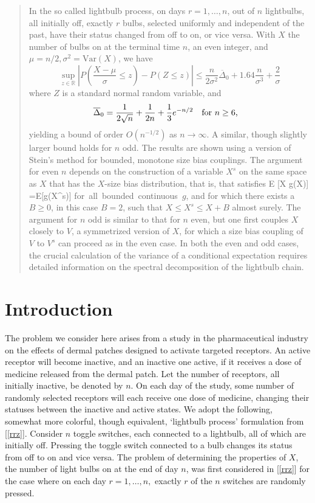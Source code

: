 \documentclass[10pt, amstex]{article}
\begin{document}
\begin{abstract}
In the so called lightbulb process, on days $r=1,\ldots,n$, out of $n$ lightbulbs, all initially off, exactly
$r$ bulbs, selected uniformly and independent of the past, have their status changed from off to on, or vice versa. With $X$ the number of bulbs on at the terminal time $n$, an even integer, and $\mu=n/2, \sigma^2=\mbox{Var}(X)$, we have
$$
\sup_{z \in \mathbb{R}} \left|P\left( \frac{X-\mu}{\sigma} \le z \right)-P(Z \le z)\right| \le \frac{n}{2\sigma^2}
\overline{\Delta}_0 + 1.64 \frac{n}{\sigma^3}+ \frac{2}{\sigma}
$$
where $Z$ is a standard normal random variable, and
$$
\overline{\Delta}_0 = \frac{1}{2\sqrt{n}} + \frac{1}{2n} + \frac{1}{3}e^{-n/2} \quad \mbox{for $n \ge 6$,} \quad
$$
yielding a bound of order $O(n^{-1/2})$ as $n \rightarrow \infty$.
A similar, though slightly larger bound holds for $n$ odd. The results are shown using a version of Stein's method for bounded, monotone size bias couplings. The argument for even $n$ depends on the construction of a variable $X^s$ on the same space as $X$ that has the $X$-size bias distribution, that is, that satisfies
\beas
E [X g(X)] =\mu E[g(X^s)] \quad \mbox{for all bounded continuous $g$,}
\enas
and for which there exists a $B \ge 0$, in this case $B=2$, such that $X \le X^s \le X+B$ almost surely. The argument for $n$ odd is similar to that for $n$ even, but one first couples $X$ closely to $V$, a symmetrized version of $X$, for which a size bias coupling of $V$ to $V^s$ can proceed as in the even case. In both the even and odd cases, the crucial calculation of the variance of a conditional expectation requires detailed information on the spectral decomposition of the lightbulb chain.
\end{abstract}

\section{Introduction}
The problem we consider here arises from a study in the pharmaceutical
industry on the effects of dermal patches designed to activate targeted receptors.
An active receptor will become inactive, and an inactive one active,
if it receives a dose of medicine released from the dermal patch. Let
the number of receptors, all initially inactive, be denoted by $n$.
On each day of the study, some number of randomly selected receptors will each receive one dose
of medicine, changing their statuses between the inactive and active states.
We adopt the following, somewhat more colorful, though equivalent, `lightbulb process' formulation from [\ref{rrz}].
Consider $n$ toggle switches, each connected to a lightbulb, all of which are initially off. Pressing the toggle
switch connected to a bulb changes its status from off to on and vice versa.
The problem of determining the properties of $X$, the number of light bulbs on at the end of day $n$, was first considered in [\ref{rrz}] for the case where on each day $r=1,\ldots,n,$ exactly $r$ of the $n$ switches are randomly pressed.
\end{document}
